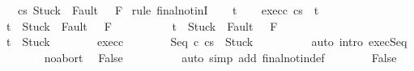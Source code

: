 \begin{isabellebody}
\ \ \ {\isachardoublequoteopen}{\isasymGamma}{\isasymturnstile}{\isasymlangle}c{}{\isacharcomma}s{\isasymrangle}\ {\isasymRightarrow}{\isasymnotin}{\isacharparenleft}{\isacharbraceleft}Stuck{\isacharbraceright}\ {\isasymunion}\ Fault\ {\isacharbackquote}\ \ F{\isacharparenright}{\isachardoublequoteclose}\isanewline
%
\isadelimproof
%
\endisadelimproof
%
\isatagproof
{}\isamarkupfalse%
\ {\isacharparenleft}rule\ final{\isacharunderscore}notinI{\isacharparenright}\isanewline
\ \ \isamarkupfalse%
\ t\isanewline
\ \ \isamarkupfalse%
\ exec{\isacharunderscore}c{}{\isacharcolon}\ {\isachardoublequoteopen}{\isasymGamma}{\isasymturnstile}{\isasymlangle}c{}{\isacharcomma}s{\isasymrangle}\ {\isasymRightarrow}\ t{\isachardoublequoteclose}\isanewline
\ \ \isamarkupfalse%
\ {\isachardoublequoteopen}t\ {\isasymnotin}\ {\isacharbraceleft}Stuck{\isacharbraceright}\ {\isasymunion}\ Fault\ {\isacharbackquote}\ \ F{\isachardoublequoteclose}\isanewline
\ \ \isamarkupfalse%
\ \isanewline
\ \ \ \ \isamarkupfalse%
\ {\isachardoublequoteopen}t\ {\isasymin}\ {\isacharbraceleft}Stuck{\isacharbraceright}\ {\isasymunion}\ Fault\ {\isacharbackquote}\ \ F{\isachardoublequoteclose}\isanewline
\ \ \ \ \isamarkupfalse%
\isanewline
\ \ \ \ \isacommand{{\isacharbraceleft}}\isamarkupfalse%
\isanewline
\ \ \ \ \ \ \isamarkupfalse%
\ {\isachardoublequoteopen}t\ {\isacharequal}\ Stuck{\isachardoublequoteclose}\isanewline
\ \ \ \ \ \ \isamarkupfalse%
\ exec{\isacharunderscore}c{}\isanewline
\ \ \ \ \ \ \isamarkupfalse%
\ {\isachardoublequoteopen}{\isasymGamma}{\isasymturnstile}{\isasymlangle}Seq\ c{}\ c{}{\isacharcomma}s{\isasymrangle}\ {\isasymRightarrow}\ Stuck{\isachardoublequoteclose}\isanewline
\ \ \ \ \ \ \ \ \isamarkupfalse%
\ {\isacharparenleft}auto\ intro{\isacharcolon}\ exec{\isacharunderscore}Seq{\isacharprime}{\isacharparenright}\isanewline
\ \ \ \ \ \ \isamarkupfalse%
\ noabort\ \isamarkupfalse%
\ False\isanewline
\ \ \ \ \ \ \ \ \isamarkupfalse%
\ {\isacharparenleft}auto\ simp\ add{\isacharcolon}\ final{\isacharunderscore}notin{\isacharunderscore}def{\isacharparenright}\isanewline
\ \ \ \ \ \ \isamarkupfalse%
\ False\ \isacommand{{\isachardot}{\isachardot}}\isamarkupfalse%
\isanewline
\ \ \ \ \isacommand{{\isacharbraceright}}\isamarkupfalse%

\end{isabellebody}
